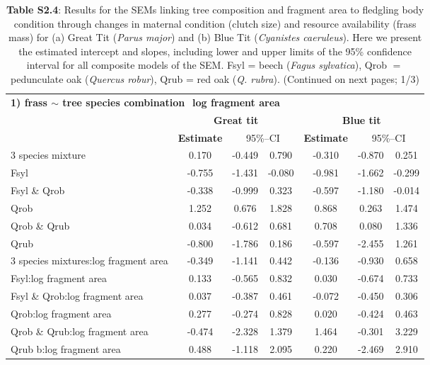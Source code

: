 \documentclass[10pt, twoside]{book} %
\begin{document}
\clearpage
\thispagestyle{plain}
\begin{landscape}
\begin{table}
	\begin{center}
		\begin{footnotesize}
			\caption*{\textbf{Table S2.4}: Results for the SEMs linking tree composition and fragment area to fledgling body condition through changes in maternal condition (clutch size) and resource availability (frass mass) for (a) Great Tit (\textit{Parus major}) and (b) Blue Tit (\textit{Cyanistes caeruleus}). Here we present the estimated intercept and slopes, including lower and upper limits of the 95\% confidence interval for all composite models of the SEM. Fsyl = beech (\textit{Fagus sylvatica}), Qrob $=$ pedunculate oak (\textit{Quercus robur}), Qrub = red oak (\textit{Q. rubra}). (Continued on next pages; 1/3)}
			
			\begingroup
			\setlength{\tabcolsep}{10pt} %
			\renewcommand{\arraystretch}{1.5} %
			\begin{tabular}{l c c c c c c}
				\toprule
				\multicolumn{7}{l}{\textbf{1) frass $\sim$ tree species combination $$ log fragment area}}\\
				& \multicolumn{3}{c}{\textbf{Great tit}} & \multicolumn{3}{c}{\textbf{Blue tit}}\\
				\cmidrule(lr){2-4}\cmidrule(lr){5-7}
				
				& \textbf{Estimate} & \multicolumn{2}{c}{95\%--CI} & \textbf{Estimate} & \multicolumn{2}{c}{95\%--CI} \\
				\cmidrule(lr){2-7}
				
				3 species mixture & 0.170 & -0.449 & 0.790 & 	-0.310 & -0.870 & 0.251\\
				Fsyl & -0.755 & -1.431 & -0.080 & 	-0.981 & -1.662 & -0.299\\
				Fsyl \& Qrob & -0.338 & -0.999 & 0.323 & 	-0.597 & -1.180 & -0.014\\
				Qrob &1.252 & 0.676 & 1.828 & 	0.868 & 0.263 & 1.474\\
				Qrob \& Qrub & 0.034 & -0.612 & 0.681 & 	0.708 & 0.080 & 1.336\\
				Qrub & -0.800 & -1.786 & 0.186 & 	-0.597 & -2.455 & 1.261\\
				\cline{1-7}
				3 species mixtures:log fragment area & -0.349 & -1.141 & 0.442 & 	-0.136 & -0.930 & 0.658\\
				Fsyl:log fragment area & 0.133 & -0.565 & 0.832 & 	0.030 & -0.674 & 0.733\\
				Fsyl \& Qrob:log fragment area &0.037 & -0.387 & 0.461 & 	-0.072 & -0.450 & 0.306\\
				Qrob:log fragment area & 0.277 & -0.274 & 0.828 & 	0.020 & -0.424 & 0.463\\
				Qrob \& Qrub:log fragment area & -0.474 & -2.328 & 1.379 & 	1.464 & -0.301 & 3.229\\
				Qrub b:log fragment area & 0.488 & -1.118 & 2.095 & 	0.220 & -2.469 & 2.910\\
				

\end{tabular}
\end{footnotesize}
\end{center}
\end{table}
\end{landscape}
\end{document}
